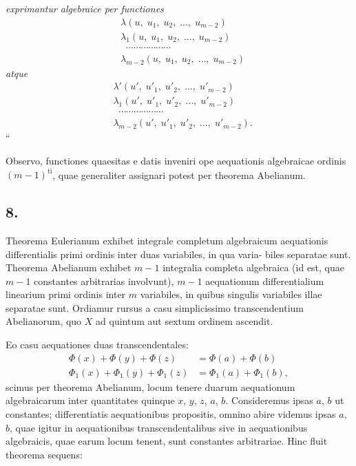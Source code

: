 \documentclass{article}
\begin{document}
\emph{exprimantur algebraice per functiones}
\[ \begin{aligned} &\lambda(u, \; u_1, \; u_2, \; \ldots, \; u_{m-2}) \\ &\lambda_1(u, \; u_1, \; u_2, \; \ldots, \; u_{m-2}) \\ &\;\; \cdots\cdots\cdots\cdots\cdots\cdots \\ &\lambda_{m-2}(u, \; u_1, \; u_2, \; \ldots, \; u_{m-2}) \end{aligned} \]
\emph{atque}
\[ \begin{aligned} &\lambda'(u', \; u'_1, \; u'_2, \; \ldots, \; u'_{m-2}) \\ &\lambda_1(u', \; u'_1, \; u'_2, \; \ldots, \; u'_{m-2}) \\ &\;\; \cdots\cdots\cdots\cdots\cdots\cdots \\ &\lambda_{m-2}(u', \; u'_1, \; u'_2, \; \ldots, \; u'_{m-2}). \end{aligned} \]“

Observo, functiones quaesitas e datis inveniri ope aequationis algebraicae ordinis $(m-1)^{\text{ti}}$, quae generaliter assignari potest per theorema Abelianum.

\subsection*{8.}

Theorema Eulerianum exhibet integrale completum algebraicum aequationis differentialis primi ordinis inter duas variabiles, in qua varia-
biles separatae sunt. Theorema Abelianum exhibet $m-1$ integralia completa algebraica (id est, quae $m-1$ constantes arbitrarias involvunt), $m-1$ aequationum differentialium linearium primi ordinis inter $m$ variabiles, in quibus singulis variabiles illae separatae sunt. Ordiamur rursus a casu simplicissimo transcendentium Abelianorum, quo $X$ ad quintum aut sextum ordinem ascendit.

Eo casu aequationes duas transcendentales:
\[ \begin{aligned} \Phi(x) + \Phi(y) + \Phi(z) &= \Phi(a) + \Phi(b) \\ \Phi_1(x) + \Phi_1(y) + \Phi_1(z) &= \Phi_1(a) + \Phi_1(b), \end{aligned} \]
scimus per theorema Abelianum, locum tenere duarum aequationum algebraicarum inter quantitates quinque $x$, $y$, $z$, $a$, $b$. Consideremus ipsas $a$, $b$ ut constantes; differentiatis aequationibus propositis, omnino abire videmus ipsas $a$, $b$, quae igitur in aequationibus transcendentalibus sive in aequationibus algebraicis, quae earum locum tenent, sunt constantes arbitrariae. Hinc fluit theorema sequens:
\end{document}
